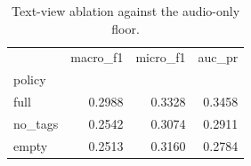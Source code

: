 \begin{table}[t]
\caption{Text-view ablation against the audio-only floor.}
\label{tab:leak2}
\begin{tabular}{lrrr}
\toprule
 & macro\_f1 & micro\_f1 & auc\_pr \\
policy &  &  &  \\
\midrule
full & 0.2988 & 0.3328 & 0.3458 \\
no\_tags & 0.2542 & 0.3074 & 0.2911 \\
empty & 0.2513 & 0.3160 & 0.2784 \\
\bottomrule
\end{tabular}
\end{table}
